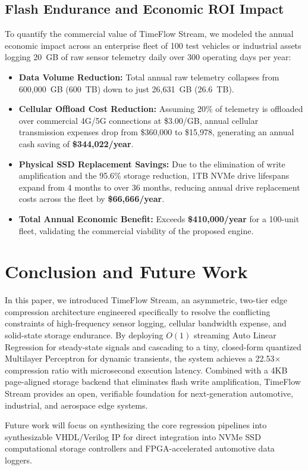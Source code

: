 \documentclass[journal]{IEEEtran}
\begin{document}
\subsection{Flash Endurance and Economic ROI Impact}
To quantify the commercial value of TimeFlow Stream, we modeled the annual economic impact across an enterprise fleet of 100 test vehicles or industrial assets logging 20~GB of raw sensor telemetry daily over 300 operating days per year:
\begin{itemize}
    \item \textbf{Data Volume Reduction:} Total annual raw telemetry collapses from 600,000~GB (600~TB) down to just 26,631~GB (26.6~TB).
    \item \textbf{Cellular Offload Cost Reduction:} Assuming 20\% of telemetry is offloaded over commercial 4G/5G connections at \$3.00/GB, annual cellular transmission expenses drop from \$360,000 to \$15,978, generating an annual cash saving of \textbf{\$344,022/year}.
    \item \textbf{Physical SSD Replacement Savings:} Due to the elimination of write amplification and the 95.6\% storage reduction, 1TB NVMe drive lifespans expand from 4 months to over 36 months, reducing annual drive replacement costs across the fleet by \textbf{\$66,666/year}.
    \item \textbf{Total Annual Economic Benefit:} Exceeds \textbf{\$410,000/year} for a 100-unit fleet, validating the commercial viability of the proposed engine.
\end{itemize}

\section{Conclusion and Future Work}
In this paper, we introduced TimeFlow Stream, an asymmetric, two-tier edge compression architecture engineered specifically to resolve the conflicting constraints of high-frequency sensor logging, cellular bandwidth expense, and solid-state storage endurance. By deploying $O(1)$ streaming Auto Linear Regression for steady-state signals and cascading to a tiny, closed-form quantized Multilayer Perceptron for dynamic transients, the system achieves a 22.53$\times$ compression ratio with microsecond execution latency. Combined with a 4KB page-aligned storage backend that eliminates flash write amplification, TimeFlow Stream provides an open, verifiable foundation for next-generation automotive, industrial, and aerospace edge systems.

Future work will focus on synthesizing the core regression pipelines into synthesizable VHDL/Verilog IP for direct integration into NVMe SSD computational storage controllers and FPGA-accelerated automotive data loggers.



\end{document}
